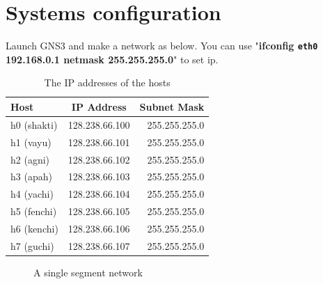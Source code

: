 \documentclass[10pt,a4paper]{article}
\numberwithin{equation}{section}
\numberwithin{figure}{section}
\numberwithin{table}{section}
\begin{document}
\section*{Systems configuration}
Launch GNS3 and make a network as below. You can use "\textbf{ifconfig \texttt{eth0} 192.168.0.1 netmask 255.255.255.0}" to set ip.
\begin{table}[H]
    \caption{The IP addresses of the hosts}
    \vspace{5pt}
    \centering
    \begin{tabular}{ l c r }
        \hline \hline
        Host & IP Address & Subnet Mask \\
        \hline 
        h0 (shakti) & 128.238.66.100 & 255.255.255.0 \\
        h1 (vayu) & 128.238.66.101 & 255.255.255.0 \\
        h2 (agni) & 128.238.66.102 & 255.255.255.0 \\
        h3 (apah) & 128.238.66.103 & 255.255.255.0 \\
        h4 (yachi) & 128.238.66.104 & 255.255.255.0 \\
        h5 (fenchi) & 128.238.66.105 & 255.255.255.0 \\
        h6 (kenchi) & 128.238.66.106 & 255.255.255.0 \\
        h7 (guchi) & 128.238.66.107 & 255.255.255.0 \\
        \hline \hline
        \end{tabular}
\end{table}

\begin{figure}[H]
    \centering
    \caption{A single segment network}        
\end{figure}
\end{document}
